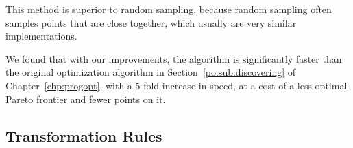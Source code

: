 This method is superior to random sampling, because random sampling often
samples points that are close together, which usually are very similar
implementations.

We found that with our improvements, the algorithm is significantly faster than
the original optimization algorithm in Section~\ref{po:sub:discovering} of
Chapter~\ref{chp:progopt}, with a 5-fold increase in speed, at a cost of a less
optimal Pareto frontier and fewer points on it.



\subsection{Transformation Rules}
\label{lo:sub:transformation_rules}

